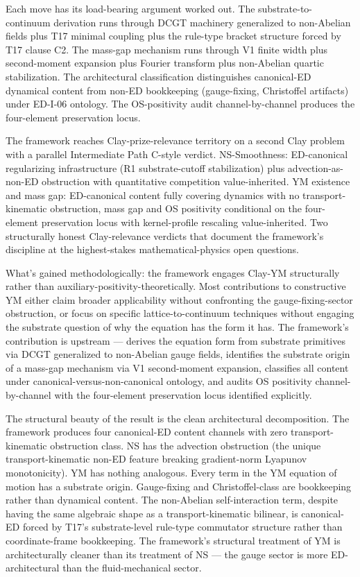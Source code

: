 \documentclass[11pt,a4paper]{article}
\begin{document}
Each move has its load-bearing argument worked out. The substrate-to-continuum derivation runs through DCGT machinery generalized to non-Abelian fields plus T17 minimal coupling plus the rule-type bracket structure forced by T17 clause C2. The mass-gap mechanism runs through V1 finite width plus second-moment expansion plus Fourier transform plus non-Abelian quartic stabilization. The architectural classification distinguishes canonical-ED dynamical content from non-ED bookkeeping (gauge-fixing, Christoffel artifacts) under ED-I-06 ontology. The OS-positivity audit channel-by-channel produces the four-element preservation locus.

The framework reaches Clay-prize-relevance territory on a second Clay problem with a parallel Intermediate Path C-style verdict. NS-Smoothness: ED-canonical regularizing infrastructure (R1 substrate-cutoff stabilization) plus advection-as-non-ED obstruction with quantitative competition value-inherited. YM existence and mass gap: ED-canonical content fully covering dynamics with no transport-kinematic obstruction, mass gap and OS positivity conditional on the four-element preservation locus with kernel-profile rescaling value-inherited. Two structurally honest Clay-relevance verdicts that document the framework's discipline at the highest-stakes mathematical-physics open questions.

What's gained methodologically: the framework engages Clay-YM structurally rather than auxiliary-positivity-theoretically. Most contributions to constructive YM either claim broader applicability without confronting the gauge-fixing-sector obstruction, or focus on specific lattice-to-continuum techniques without engaging the substrate question of why the equation has the form it has. The framework's contribution is upstream --- derives the equation form from substrate primitives via DCGT generalized to non-Abelian gauge fields, identifies the substrate origin of a mass-gap mechanism via V1 second-moment expansion, classifies all content under canonical-versus-non-canonical ontology, and audits OS positivity channel-by-channel with the four-element preservation locus identified explicitly.

The structural beauty of the result is the clean architectural decomposition. The framework produces four canonical-ED content channels with zero transport-kinematic obstruction class. NS has the advection obstruction (the unique transport-kinematic non-ED feature breaking gradient-norm Lyapunov monotonicity). YM has nothing analogous. Every term in the YM equation of motion has a substrate origin. Gauge-fixing and Christoffel-class are bookkeeping rather than dynamical content. The non-Abelian self-interaction term, despite having the same algebraic shape as a transport-kinematic bilinear, is canonical-ED forced by T17's substrate-level rule-type commutator structure rather than coordinate-frame bookkeeping. The framework's structural treatment of YM is architecturally cleaner than its treatment of NS --- the gauge sector is more ED-architectural than the fluid-mechanical sector.
\end{document}
